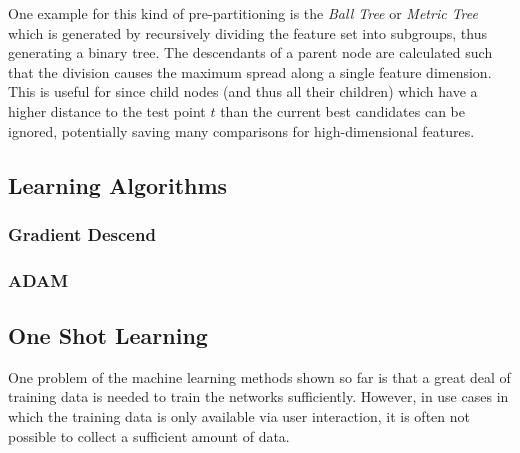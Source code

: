 		One example for this kind of pre-partitioning is the \textit{Ball Tree} or \textit{Metric Tree} which is generated by recursively dividing the feature set into subgroups, thus generating a binary tree. The descendants of a parent node are calculated such that the division causes the maximum spread along a single feature dimension. This is useful for  since child nodes (and thus all their children) which have a higher distance to the test point $t$ than the current best candidates can be ignored, potentially saving many comparisons for high-dimensional features.
		
		\begin{figure}
			\centering
			\fontsize{7.5pt}{11pt}\selectfont%
			\begin{subfigure}[c]{0.4\textwidth}
				\centering
				\def\svgwidth{\textwidth}
				
			\end{subfigure}
			\begin{subfigure}[c]{0.4\textwidth}
				\centering
				\def\svgwidth{\textwidth}
				
			\end{subfigure}
			\caption{}
			\label{fig:simpleperceptron}
		\end{figure}
		
		\subsection{Learning Algorithms}

		\subsubsection{Gradient Descend}
		\label{sec:gradient-descend}
		
		\subsubsection{ADAM}
		
	\subsection{ One Shot Learning }
	One problem of the machine learning methods shown so far is that a great deal of training data is needed to train the networks sufficiently. However, in use cases in which the training data is only available via user interaction, it is often not possible to collect a sufficient amount of data. 

